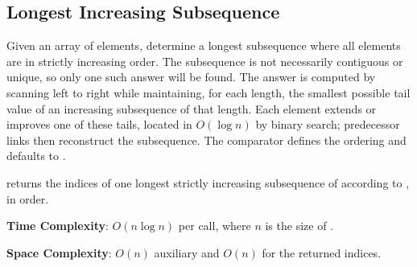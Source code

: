 \subsection{Longest Increasing Subsequence}
\label{sec:1.3.2}
Given an array of elements, determine a longest subsequence where all elements are in strictly increasing order. The subsequence is not necessarily contiguous or unique, so only one such answer will be found. The answer is computed by scanning left to right while maintaining, for each length, the smallest possible tail value of an increasing subsequence of that length. Each element extends or improves one of these tails, located in $O(\log n)$ by binary search; predecessor links then reconstruct the subsequence. The comparator  defines the ordering and defaults to .

\begin{compactitem}
  \item {} returns the indices of one longest strictly increasing subsequence of  according to , in order.
\end{compactitem}

\textbf{Time Complexity}: $O(n \log n)$ per call, where $n$ is the size of .

\textbf{Space Complexity}: $O(n)$ auxiliary and $O(n)$ for the returned indices.

